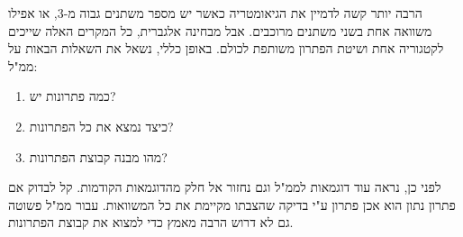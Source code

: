 \documentclass[12pt]{report}
\theoremstyle{plain}
\theoremstyle{definition}
\newcommand{\0}{\mathbf{0}}
\begin{document}
הרבה יותר קשה לדמיין את הגיאומטריה כאשר יש מספר משתנים גבוה מ-$3$,
או אפילו משוואה אחת בשני משתנים מרוכבים. אבל מבחינה אלגברית, כל המקרים
האלה שייכים לקטגוריה אחת ושיטת הפתרון משותפת לכולם. באופן כללי, נשאל
את השאלות הבאות על ממ"ל:

\begin{enumerate}

\item כמה פתרונות יש?

\item כיצד נמצא את כל הפתרונות?

\item מהו מבנה קבוצת הפתרונות?
\end{enumerate}

לפני כן, נראה עוד דוגמאות לממ"ל וגם נחזור אל חלק מהדוגמאות
הקודמות. קל לבדוק אם פתרון נתון הוא אכן פתרון ע"י בדיקה
שהצבתו מקיימת את כל המשוואות. עבור ממ"ל פשוטה גם לא
דרוש הרבה מאמץ כדי למצוא את קבוצת הפתרונות.
\end{document}
